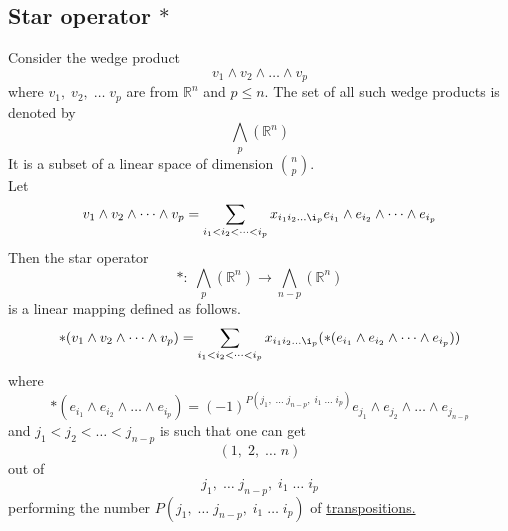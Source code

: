 \documentclass[color=black,11pt]{elegantpaper}
\begin{document}
\subsection{Star operator $\ast $ }
Consider the wedge product
$$
v_1\wedge v_2 \wedge \dots \wedge v_p
$$
where $ v_1,\; v_2, \; \dots \; v_p$ are from $\mathbb{R}^n$
 and $ p \le  n.$ The set of all such wedge products is denoted by
$$
{\bigwedge}_p(\mathbb{R}^n)
$$
It is a subset of a linear space of dimension ${n \choose p}.$\\
Let
$$
v_1\wedge v_2 \wedge \dots \wedge v_p = \sum_{i_1 < i_2<\dots <i_p} x_{i_1 i_2 \dots \i_p} e_{i_1}\wedge e_{i_2} \wedge \dots \wedge e_{i_p}
$$
Then the star operator
$$
\ast : \; {\bigwedge}_p(\mathbb{R}^n) \to {\bigwedge}_{n-p}(\mathbb{R}^n)
$$
is a linear mapping defined as follows.
$$
\ast(v_1\wedge v_2 \wedge \dots \wedge v_p) = \sum_{i_1 < i_2<\dots <i_p} x_{i_1 i_2 \dots \i_p}(\ast( e_{i_1}\wedge e_{i_2} \wedge \dots \wedge e_{i_p}))
$$
where
$$
\ast( e_{i_1}\wedge e_{i_2} \wedge \dots \wedge e_{i_p}) = (-1)^{P(j_1,\; \dots \; j_{n-p}, \; i_1 \; \dots \; i_p)}  e_{j_1}\wedge e_{j_2} \wedge \dots \wedge e_{j_{n-p}}
$$
and $j_1 < j_2<\dots <j_{n-p}$  is such that one can get
$$
(1,\;2,\;\dots \; n)
$$
out of
$$
 j_1,\; \dots \; j_{n-p}, \; i_1 \; \dots \; i_p
$$
performing the number $P(j_1,\; \dots \; j_{n-p}, \; i_1 \; \dots \; i_p)$ of \href{https://en.wikipedia.org/wiki/Cyclic_permutation#Transpositions}{transpositions.}

\vspace{0.1cm}
\end{document}
